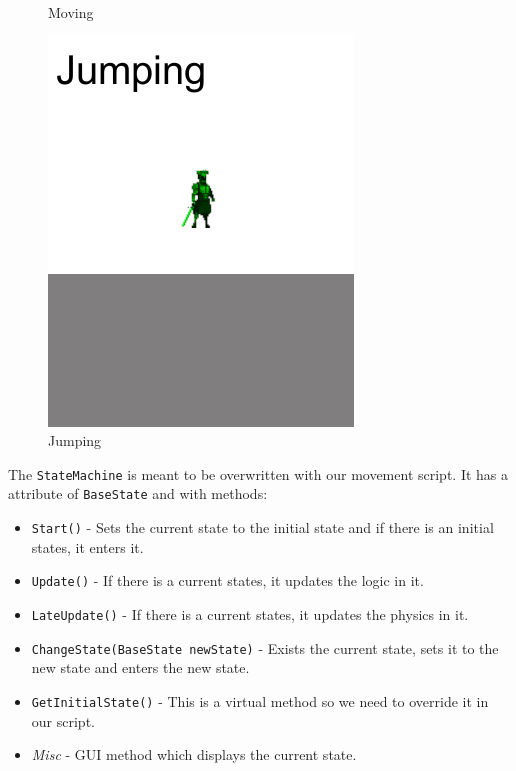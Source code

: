 \documentclass[a4paper, 12pt]{book}
\begin{document}
\begin{figure}[!hb]
  \caption{Moving}\label{StateFig:Moving}
\endminipage\hfill
{}%
  \includegraphics[width=\linewidth]{Images/JumpingState.png}
  \caption{Jumping}\label{StateFig:Jumping}
\endminipage
\label{StateMachine}
\end{figure}

The \texttt{StateMachine} is meant to be overwritten with our movement script. It has a attribute of \texttt{BaseState} and with methods: 
\begin{itemize}
    \item \texttt{Start()} - Sets the current state to the initial state and if there is an initial states, it enters it.
    \item \texttt{Update()} - If there is a current states, it updates the logic in it.
    \item \texttt{LateUpdate()} - If there is a current states, it updates the physics in it.
    \item \texttt{ChangeState(BaseState newState)} - Exists the current state, sets it to the new state and enters the new state.
    \item \texttt{GetInitialState()} - This is a virtual method so we need to override it in our script.
    \item \emph{Misc} - GUI method which displays the current state.
\end{itemize}
\end{document}
